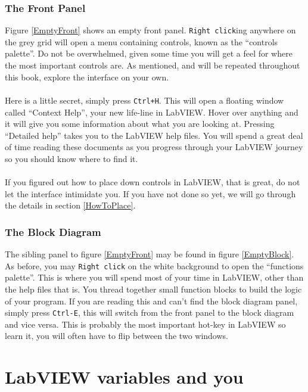 	\subsubsection{The Front Panel}
	Figure \ref{EmptyFront} shows an empty front panel. \texttt{Right click}ing anywhere on the grey grid will open a menu containing controls, known as the ``controls palette''. Do not be overwhelmed, given some time you will get a feel for where the most important controls are. As mentioned, and will be repeated throughout this book, explore the interface on your own.\\
	\\
	Here is a little secret, simply press \texttt{Ctrl+H}. This will open a floating window called ``Context Help'', your new life-line in LabVIEW. Hover over anything and it will give you some information about what you are looking at.  Pressing ``Detailed help'' takes you to the LabVIEW help files. You will spend a great deal of time reading these documents as you progress through your LabVIEW journey so you should know where to find it.\\
	\\
	If you figured out how to place down controls in LabVIEW, that is great, do not let the interface intimidate you. If you have not done so yet, we will go through the details in section \ref{HowToPlace}.
	\subsubsection{The Block Diagram}
	The sibling panel to figure \ref{EmptyFront} may be found in figure \ref{EmptyBlock}. As before, you may \texttt{Right click} on the white background to open the ``functions palette''. This is where you will spend most of your time in LabVIEW, other than the help files that is. You thread together small function blocks to build the logic of your program. If you are reading this and can't find the block diagram panel, simply press \texttt{Ctrl-E}, this will switch from the front panel to the block diagram and vice versa. This is probably the most important hot-key in LabVIEW so learn it, you will often have to flip between the two windows.\\
	
	\section{LabVIEW variables and you}
